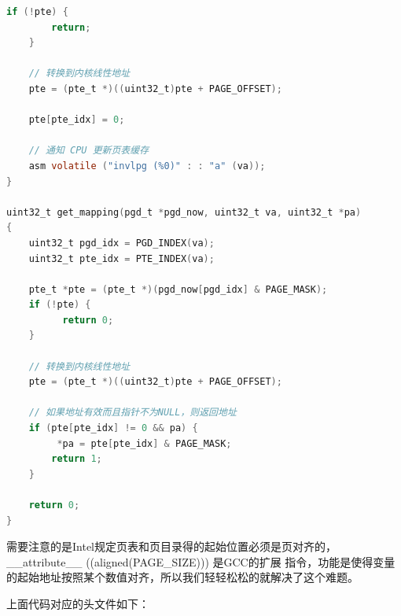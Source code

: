 \begin{lstlisting}[language = C, caption = mm/vmm.c]
	if (!pte) {
		return;
	}

	// 转换到内核线性地址
	pte = (pte_t *)((uint32_t)pte + PAGE_OFFSET);

	pte[pte_idx] = 0;

	// 通知 CPU 更新页表缓存
	asm volatile ("invlpg (%0)" : : "a" (va));
}

uint32_t get_mapping(pgd_t *pgd_now, uint32_t va, uint32_t *pa)
{
	uint32_t pgd_idx = PGD_INDEX(va);
	uint32_t pte_idx = PTE_INDEX(va);

	pte_t *pte = (pte_t *)(pgd_now[pgd_idx] & PAGE_MASK);
	if (!pte) {
	      return 0;
	}
	
	// 转换到内核线性地址
	pte = (pte_t *)((uint32_t)pte + PAGE_OFFSET);

	// 如果地址有效而且指针不为NULL，则返回地址
	if (pte[pte_idx] != 0 && pa) {
		 *pa = pte[pte_idx] & PAGE_MASK;
		return 1;
	}

	return 0;
}
\end{lstlisting}

\par 需要注意的是Intel规定页表和页目录得的起始位置必须是页对齐的，\_\_attribute\_\_ ((aligned(PAGE\_SIZE))) 是GCC的扩展\allowbreak
指令，功能是使得变量的起始地址按照某个数值对齐，所以我们轻轻松松的就解决了这个难题。

\par 上面代码对应的头文件如下：

